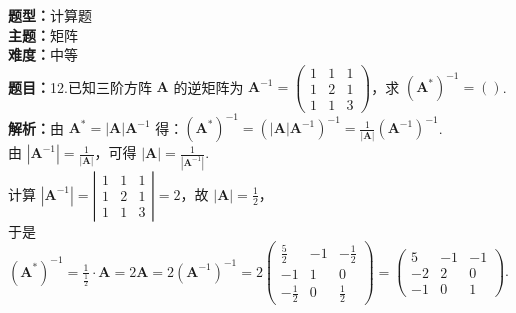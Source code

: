 \documentclass{ctexart}
\newenvironment{question}[5]{%
	\noindent\textbf{题型：}#1\\
	\textbf{主题：}#2\\
	\textbf{难度：}#3\\
	\textbf{题目：}#4\\
	\textbf{解析：}#5\\
	\vspace{1em}
}{}
\begin{document}
	\begin{question}
		{计算题}
		{矩阵}
		{中等}
		{12.已知三阶方阵 \(\mathbf{A}\) 的逆矩阵为 \(\mathbf{A}^{-1} = \left(\begin{array}{ccc}1 & 1 & 1 \\ 1 & 2 & 1 \\ 1 & 1 & 3\end{array}\right)\)，求 \(\left(\mathbf{A}^*\right)^{-1} = ()\). }
		{由 \(\mathbf{A}^* = |\mathbf{A}| \mathbf{A}^{-1}\) 得：\(\left(\mathbf{A}^*\right)^{-1} = \left(|\mathbf{A}| \mathbf{A}^{-1} \right)^{-1} = \frac{1}{|\mathbf{A}|} (\mathbf{A}^{-1})^{-1}\). \\
			由 \(\left|\mathbf{A}^{-1}\right| = \frac{1}{|\mathbf{A}|}\)，可得 \(|\mathbf{A}| = \frac{1}{\left|\mathbf{A}^{-1}\right|}\). \\
			计算 \(|\mathbf{A}^{-1}| = \left|\begin{array}{ccc}1 & 1 & 1 \\ 1 & 2 & 1 \\ 1 & 1 & 3\end{array}\right| = 2\)，故 \(|\mathbf{A}| = \frac{1}{2}\)，\\
			于是 \(\left(\mathbf{A}^*\right)^{-1} = \frac{1}{\frac{1}{2}} \cdot \mathbf{A} = 2\mathbf{A} = 2 \left(\mathbf{A}^{-1}\right)^{-1} = 2 \left(\begin{array}{ccc}\frac{5}{2} & -1 & -\frac{1}{2} \\ -1 & 1 & 0 \\ -\frac{1}{2} & 0 & \frac{1}{2}\end{array}\right) = \left(\begin{array}{ccc}5 & -1 & -1 \\ -2 & 2 & 0 \\ -1 & 0 & 1\end{array}\right)\). }
	\end{question}
	
\end{document}
